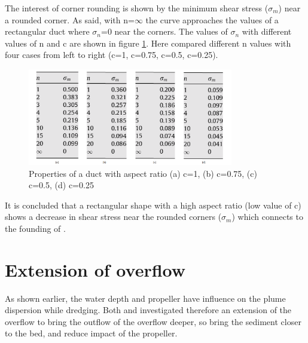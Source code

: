 
\noindent The interest of corner rounding is shown by the minimum shear stress ($\sigma_m$) near a rounded corner. As said, with n=$\infty$ the curve approaches the values of a rectangular duct where $\sigma_n$=0 near the corners. The values of $\sigma_n$ with different values of n and c are shown in figure \ref{fig:shapes_table}. Here \cite{Wang} compared different n values with four cases from left to right (c=1, c=0.75, c=0.5, c=0.25).


\begin{figure}[ht!]
    \centering
    \includegraphics[width=0.8\textwidth]{Images/n_sigma_m.png}
    \caption{Properties of a duct with aspect ratio (a) c=1, (b) c=0.75, (c) c=0.5, (d) c=0.25}
    \label{fig:shapes_table}
\end{figure}


\noindent It is concluded that a rectangular shape with a high aspect ratio (low value of c) shows a decrease in shear stress near the rounded corners ($\sigma_m$) which connects to the founding of \cite{Decrop}.










\newpage
\section{Extension of overflow}
\label{sec:extension}

As shown earlier, the water depth and propeller have influence on the plume dispersion while dredging. Both \cite{Dewit} and \cite{Decrop} investigated therefore an extension of the overflow to bring the outflow of the overflow deeper, so bring the sediment closer to the bed, and reduce impact of the propeller. \newline

